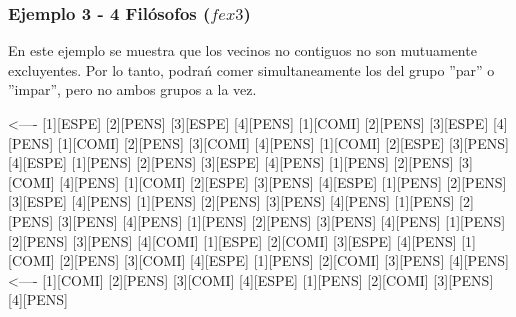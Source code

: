\begin{scriptsize} 
\begin{verbatimtab} 
[1][PENS]  [2][ESPE]  [3][PENS]  
[1][PENS]  [2][COMI]  [3][PENS]  
[1][PENS]  [2][PENS]  [3][COMI]  
[1][PENS]  [2][PENS]  [3][PENS]  
[1][PENS]  [2][PENS]  [3][PENS]  
[1][PENS]  [2][ESPE]  [3][COMI]  
[1][ESPE]  [2][PENS]  [3][ESPE]  
[1][COMI]  [2][PENS]  [3][ESPE]  
[1][COMI]  [2][ESPE]  [3][ESPE]  
[1][ESPE]  [2][PENS]  [3][ESPE]  
[1][COMI]  [2][PENS]  [3][ESPE]  
\end{verbatimtab}
\end{scriptsize}
\subsubsection{Ejemplo 3 - 4 Fil\'osofos ($fex3$)}
En este ejemplo se muestra que los vecinos no contiguos no son mutuamente excluyentes. Por lo tanto,
podrań comer simultaneamente los del grupo ''par'' o ''impar'', pero no ambos grupos a la vez.

\begin{scriptsize} 
\begin{verbatimtab} 
[1][PENS]  [2][PENS]  [3][PENS]  [4][PENS]  
[1][PENS]  [2][COMI]  [3][ESPE]  [4][COMI]  <----
[1][ESPE]  [2][PENS]  [3][ESPE]  [4][PENS]  
[1][COMI]  [2][PENS]  [3][ESPE]  [4][PENS]  
[1][COMI]  [2][PENS]  [3][COMI]  [4][PENS]  
[1][COMI]  [2][ESPE]  [3][PENS]  [4][ESPE]  
[1][PENS]  [2][PENS]  [3][ESPE]  [4][PENS]  
[1][PENS]  [2][PENS]  [3][COMI]  [4][PENS]  
[1][COMI]  [2][ESPE]  [3][PENS]  [4][ESPE]  
[1][PENS]  [2][PENS]  [3][ESPE]  [4][PENS]  
[1][PENS]  [2][PENS]  [3][PENS]  [4][PENS]  
[1][PENS]  [2][PENS]  [3][PENS]  [4][PENS]  
[1][PENS]  [2][PENS]  [3][PENS]  [4][PENS]  
[1][PENS]  [2][PENS]  [3][PENS]  [4][COMI]  
[1][ESPE]  [2][COMI]  [3][ESPE]  [4][PENS]  
[1][COMI]  [2][PENS]  [3][COMI]  [4][ESPE]  
[1][PENS]  [2][COMI]  [3][PENS]  [4][PENS] <---- 
[1][COMI]  [2][PENS]  [3][COMI]  [4][ESPE]  
[1][PENS]  [2][COMI]  [3][PENS]  [4][PENS]   
\end{verbatimtab}
\end{scriptsize}

